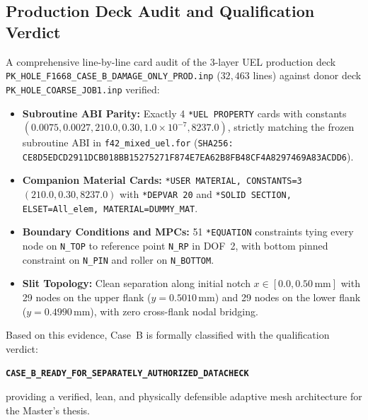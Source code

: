 \subsection{Production Deck Audit and Qualification Verdict}
A comprehensive line-by-line card audit of the 3-layer UEL production deck \nolinkurl{PK_HOLE_F1668_CASE_B_DAMAGE_ONLY_PROD.inp} ($32{,}463$ lines) against donor deck \nolinkurl{PK_HOLE_COARSE_JOB1.inp} verified:
\begin{itemize}
  \item \textbf{Subroutine ABI Parity:} Exactly 4 \nolinkurl{*UEL PROPERTY} cards with constants $(0.0075, 0.0027, 210.0, 0.30, 1.0\times 10^{-7}, 8237.0)$, strictly matching the frozen subroutine ABI in \nolinkurl{f42_mixed_uel.for} (\nolinkurl{SHA256: CE8D5EDCD2911DCB018BB15275271F874E7EA62B8FB48CF4A8297469A83ACDD6}).
  \item \textbf{Companion Material Cards:} \nolinkurl{*USER MATERIAL, CONSTANTS=3} $(210.0, 0.30, 8237.0)$ with \nolinkurl{*DEPVAR 20} and \nolinkurl{*SOLID SECTION, ELSET=All_elem, MATERIAL=DUMMY_MAT}.
  \item \textbf{Boundary Conditions and MPCs:} 51 \nolinkurl{*EQUATION} constraints tying every node on \nolinkurl{N_TOP} to reference point \nolinkurl{N_RP} in DOF~2, with bottom pinned constraint on \nolinkurl{N_PIN} and roller on \nolinkurl{N_BOTTOM}.
  \item \textbf{Slit Topology:} Clean separation along initial notch $x \in [0.0, 0.50\,\mathrm{mm}]$ with 29 nodes on the upper flank ($y = 0.5010\,\mathrm{mm}$) and 29 nodes on the lower flank ($y = 0.4990\,\mathrm{mm}$), with zero cross-flank nodal bridging.
\end{itemize}

Based on this evidence, Case~B is formally classified with the qualification verdict:
\begin{center}
  \textbf{\texttt{CASE\_B\_READY\_FOR\_SEPARATELY\_AUTHORIZED\_DATACHECK}}
\end{center}
providing a verified, lean, and physically defensible adaptive mesh architecture for the Master's thesis.
